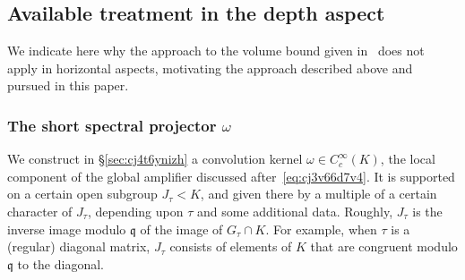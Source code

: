 \documentclass[reqno]{amsart}
\theoremstyle{plain} \newtheorem{theorem} {Theorem} \newtheorem{conjecture} {Conjecture} \newtheorem{corollary} [theorem] {Corollary} \newtheorem{proposition} [theorem] {Proposition} \newtheorem{fact} [theorem] {Fact}
\theoremstyle{definition} \newtheorem{definition} [theorem] {Definition}
\theoremstyle{itplain} %
\begin{document}
\subsection{Available treatment in the depth aspect}\label{sec:cj4t64wm4h}
We indicate here why the approach to the volume bound given in~\cite{2020arXiv201202187N} does not apply in horizontal aspects, motivating the approach described above and pursued in this paper.

\subsubsection{The short spectral projector $\omega$}
We construct in \S\ref{sec:cj4t6ynizh} a convolution kernel $\omega \in C_c^\infty(K)$, the local component of the global amplifier discussed after~\eqref{eq:cj3v66d7v4}.  It is supported on a certain open subgroup $J_\tau < K$, and given there by a multiple of a certain character of $J_\tau$, depending upon $\tau$ and some additional data.  Roughly, $J_\tau$ is the inverse image modulo $\mathfrak{q}$ of the image of $G_\tau \cap K$.  For example, when $\tau$ is a (regular) diagonal matrix, $J_\tau$ consists of elements of $K$ that are congruent modulo $\mathfrak{q}$ to the diagonal.
\end{document}
